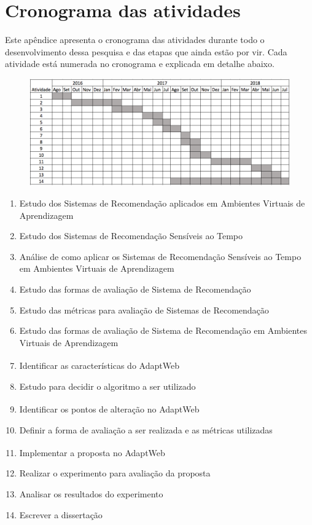 \chapter{Cronograma das atividades}\label{ape:cronograma}

Este apêndice apresenta o cronograma das atividades durante todo o desenvolvimento dessa pesquisa e das etapas que ainda
estão por vir. Cada atividade está numerada no cronograma e explicada em detalhe abaixo.

\begin{figure}[htb]
  \begin{center}
      \includegraphics[scale=0.45]{./Figuras/cronograma.png}
  \end{center}
\end{figure}

\begin{enumerate}
\item Estudo dos Sistemas de Recomendação aplicados em Ambientes Virtuais de Aprendizagem
\item Estudo dos Sistemas de Recomendação Sensíveis ao Tempo
\item Análise de como aplicar os Sistemas de Recomendação Sensíveis ao Tempo em Ambientes Virtuais de Aprendizagem
\item Estudo das formas de avaliação de Sistema de Recomendação
\item Estudo das métricas para avaliação de Sistemas de Recomendação
\item Estudo das formas de avaliação de Sistema de Recomendação em Ambientes Virtuais de Aprendizagem
\item Identificar as características do AdaptWeb\textsuperscript{\textregistered}
\item Estudo para decidir o algoritmo a ser utilizado
\item Identificar os pontos de alteração no AdaptWeb\textsuperscript{\textregistered}
\item Definir a forma de avaliação a ser realizada e as métricas utilizadas
\item Implementar a proposta no AdaptWeb\textsuperscript{\textregistered}
\item Realizar o experimento para avaliação da proposta
\item Analisar os resultados do experimento
\item Escrever a dissertação
\end{enumerate}
